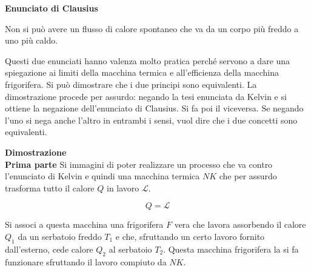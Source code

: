 \textbf{Enunciato di Clausius}

\noindent{}

Non si può avere un flusso di calore spontaneo che va da un corpo più freddo a uno più caldo.

Questi due enunciati hanno valenza molto pratica perché servono a dare una spiegazione ai limiti della macchina termica e all'efficienza della macchina frigorifera. Si può dimostrare che i due principi sono equivalenti. La dimostrazione procede per assurdo: negando la tesi enunciata da Kelvin e si ottiene la negazione dell'enunciato di Clausius. Si fa poi il viceversa. Se negando l'uno si nega anche l'altro in entrambi i sensi, vuol dire che i due concetti sono equivalenti.

\textbf{Dimostrazione}
\\

\textbf{Prima parte} Si immagini di poter realizzare un processo che va contro l'enunciato di Kelvin e quindi una macchina termica $NK$ che per assurdo trasforma tutto il calore $Q$ in lavoro $\mathcal{L}$.

\[
	Q = \mathcal{L}
\]

Si associ a questa macchina una frigorifera $F$ vera che lavora assorbendo il calore $Q_1$ da un serbatoio freddo $T_1$ e che, sfruttando un certo lavoro fornito dall'esterno, cede calore $Q_2$ al serbatoio $T_2$. Questa macchina frigorifera la si fa funzionare sfruttando il lavoro compiuto da $NK$.

